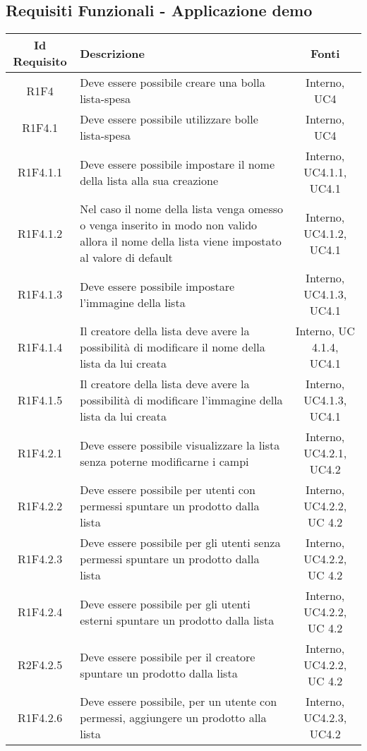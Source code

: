 \newpage
\subsection{Requisiti Funzionali - Applicazione demo}
\normalsize
\begingroup
\renewcommand\arraystretch{2}
\begin{longtable}{|c|>{\centering}m{7cm}|c|}
\hline
\textbf{Id Requisito} & \textbf{Descrizione} & \textbf{Fonti}\\
\hline
\endhead
			R1F4 & Deve essere possibile creare una bolla lista-spesa  & Interno, UC4 \\
			\hline
			R1F4.1 & Deve essere possibile utilizzare bolle lista-spesa  & Interno, UC4 \\
			\hline
			R1F4.1.1 & Deve essere possibile impostare il nome della lista alla sua creazione & Interno, UC4.1.1, UC4.1 \\
			\hline
			R1F4.1.2 & Nel caso il nome della lista venga omesso o venga inserito in modo non valido allora il nome della lista viene impostato al valore di default & Interno, UC4.1.2, UC4.1 \\
			\hline
			R1F4.1.3 & Deve essere possibile impostare l'immagine della lista & Interno, UC4.1.3, UC4.1 \\
			\hline
			R1F4.1.4 & Il creatore della lista deve avere la possibilità di modificare il nome della lista da lui creata & Interno, UC 4.1.4, UC4.1 \\
			\hline
			R1F4.1.5 & Il creatore della lista deve avere la possibilità di modificare l'immagine della lista da lui creata & Interno, UC4.1.3, UC4.1 \\
			\hline
			R1F4.2.1 & Deve essere possibile visualizzare la lista senza poterne modificarne i campi & Interno, UC4.2.1, UC4.2 \\
			\hline
			R1F4.2.2 & Deve essere possibile per utenti con permessi spuntare un prodotto dalla lista & Interno, UC4.2.2, UC 4.2 \\
			\hline
			R1F4.2.3 & Deve essere possibile per gli utenti senza permessi spuntare un prodotto dalla lista & Interno, UC4.2.2, UC 4.2 \\
			\hline
			R1F4.2.4 & Deve essere possibile per gli utenti esterni spuntare un prodotto dalla lista & Interno, UC4.2.2, UC 4.2 \\
			\hline
			R2F4.2.5 & Deve essere possibile per il creatore spuntare un prodotto dalla lista & Interno, UC4.2.2, UC 4.2 \\
			\hline
			R1F4.2.6 & Deve essere possibile, per un utente con permessi, aggiungere un prodotto alla lista & Interno, UC4.2.3, UC4.2 \\

\end{longtable}
